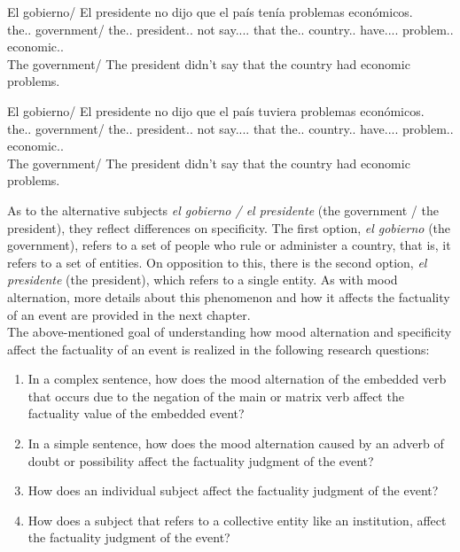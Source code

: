 \begin{exe}
  \ex
    \begin{xlist}
      \item{\gll El gobierno/ El presidente no dijo que el país tenía problemas económicos.\\ the.\M.\Sg{} government/ the.\M.\Sg{} president.\M.\Sg{} not say.\Pst.\Pfv.\Ind.\Tsg{} that the.\M.\Sg{} country.\F.\Sg{} have.\Pst.\Ipfv.\Ind.\Tsg{} problem.\M.\Pl{} economic.\M.\Pl{} \\\glt The government/ The president didn't say that the country had economic problems.}\label{ex:cond1}
      \item{\gll El gobierno/ El presidente no dijo que el país tuviera problemas económicos.\\ the.\M.\Sg{} government/ the.\M.\Sg{} president.\M.\Sg{} not say.\Pst.\Pfv.\Ind.\Tsg{} that the.\M.\Sg{} country.\F.\Sg{} have.\Pst.\Ipfv.\Sbjv.\Tsg{} problem.\M.\Pl{} economic.\M.\Pl{} \\\glt The government/ The president didn't say that the country had economic problems.}\label{ex:cond2}
    \end{xlist}
\end{exe}

As to the alternative subjects \textit{el gobierno / el presidente} (the government / the president), they reflect differences on specificity. The first option, \textit{el gobierno} (the government), refers to a set of people who rule or administer a country, that is, it refers to a set of entities. On opposition to this, there is the second option, \textit{el presidente} (the president), which refers to a single entity. As with mood alternation, more details about this phenomenon and how it affects the factuality of an event are provided in the next chapter.\\

The above-mentioned goal of understanding how mood alternation and specificity affect the factuality of an event is realized in the following research questions:\\  

\begin{enumerate}[RQ1.-]
        \item In a complex sentence, how does the mood alternation of the embedded verb that occurs due to the negation of the main or matrix verb affect the factuality value of the embedded event?
        \item In a simple sentence, how does the mood alternation caused by an adverb of doubt or possibility affect the factuality judgment of the event?\label{item:rq2}
        \item How does an individual subject affect the factuality judgment of the event?
        \item How does a subject that refers to a collective entity like an institution, affect the factuality judgment of the event?\label{item:rq4}
\end{enumerate}

